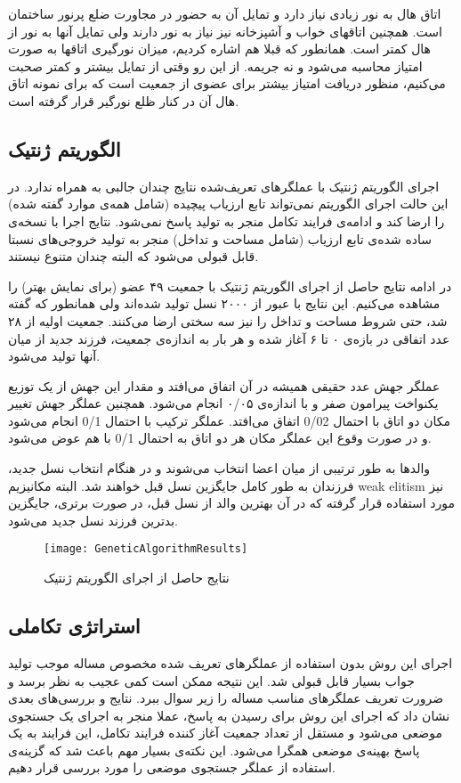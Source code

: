 \documentclass{report}
\begin{document}
اتاق هال به نور زیادی نیاز دارد و تمایل آن به حضور در مجاورت ضلع پرنور ساختمان است. همچنین اتاقهای خواب و آشپزخانه نیز نیاز به نور دارند ولی تمایل آنها به نور از هال کمتر است. همانطور که قبلا هم اشاره کردیم، میزان نورگیری اتاقها به صورت امتیاز محاسبه می‌شود و نه جریمه. از این رو وقتی از تمایل بیشتر و کمتر صحبت می‌کنیم، منظور دریافت امتیاز بیشتر برای عضوی از جمعیت است که برای نمونه اتاق هال آن در کنار ظلع نورگیر قرار گرفته است.

\subsection{الگوریتم ژنتیک}
اجرای الگوریتم ژنتیک با عملگرهای تعریف‌شده نتایج چندان جالبی به همراه ندارد. در این حالت اجرای الگوریتم نمی‌تواند تابع ارزیاب پیچیده (شامل همه‌ی موارد گفته شده) را ارضا کند و ادامه‌ی فرایند تکامل منجر به تولید پاسخ نمی‌شود. نتایج اجرا با نسخه‌ی ساده شده‌ی تابع ارزیاب (شامل مساحت و تداخل) منجر به تولید خروجی‌های نسبتا قابل قبولی می‌شود که البته چندان متنوع نیستند.

در ادامه نتایج حاصل از اجرای الگوریتم ژنتیک با جمعیت ۴۹ عضو‌ (برای نمایش بهتر) را مشاهده می‌کنیم. این نتایج با عبور از ۲۰۰۰ نسل تولید شده‌اند ولی همانطور که گفته شد، حتی شروط مساحت و تداخل را نیز سه سختی ارضا می‌کنند. جمعیت اولیه از ۲۸ عدد اتفاقی در بازه‌ی ۰ تا ۶ آغاز شده و هر بار به اندازه‌ی جمعیت، فرزند جدید از میان آنها تولید می‌شود.

عملگر جهش عدد حقیقی همیشه در آن اتفاق می‌افتد و مقدار این جهش از یک توزیع یکنواخت پیرامون صفر و با اندازه‌ی ۰/۰۵ انجام می‌شود. همچنین عملگر جهش تغییر مکان دو اتاق با احتمال 0/02 اتفاق می‌افتد. عملگر ترکیب با احتمال 0/1 انجام می‌شود و در صورت وقوع این عملگر مکان هر دو اتاق به احتمال 0/1 با هم عوض می‌شود.

والدها به طور ترتیبی از میان اعضا انتخاب می‌شوند و در هنگام انتخاب نسل جدید، فرزندان به طور کامل جایگزین نسل قبل خواهند شد. البته مکانیزیم weak elitism نیز مورد استفاده قرار گرفته که در آن بهترین والد از نسل قبل، در صورت برتری، جایگزین بدترین فرزند نسل جدید می‌شود.

\begin{figure} \centerline{\texttt{[image: GeneticAlgorithmResults]}} \caption{\label{fGeneticAlgorithmResults}
نتایج حاصل از اجرای الگوریتم ژنتیک
} \end{figure}

\subsection{استراتژی تکاملی}
اجرای این روش بدون استفاده از عملگرهای تعریف شده مخصوص مساله موجب تولید جواب بسیار قابل قبولی شد. این نتیجه ممکن است کمی عجیب به نظر برسد و ضرورت تعریف عملگرهای مناسب مساله را زیر سوال ببرد. نتایج و بررسی‌های بعدی نشان داد که اجرای این روش برای رسیدن به پاسخ، عملا منجر به اجرای یک جستجوی موضعی می‌شود و مستقل از تعداد جمعیت آغاز کننده فرایند تکامل، این فرایند به یک پاسخ بهینه‌ی موضعی همگرا می‌شود. این نکته‌ی بسیار مهم باعث شد که گزینه‌ی استفاده از عملگر جستجوی موضعی را مورد بررسی قرار دهیم.
\end{document}
